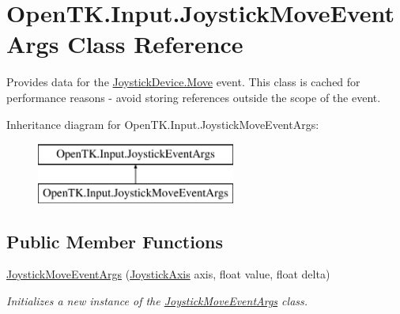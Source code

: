 \hypertarget{class_open_t_k_1_1_input_1_1_joystick_move_event_args}{\section{Open\-T\-K.\-Input.\-Joystick\-Move\-Event\-Args Class Reference}
\label{class_open_t_k_1_1_input_1_1_joystick_move_event_args}
}


Provides data for the \hyperlink{class_open_t_k_1_1_input_1_1_joystick_device_ad9dcc4f6506c543d16e326c7ee08da39}{Joystick\-Device.\-Move} event. This class is cached for performance reasons -\/ avoid storing references outside the scope of the event.  


Inheritance diagram for Open\-T\-K.\-Input.\-Joystick\-Move\-Event\-Args\-:\begin{figure}[H]
\begin{center}
\leavevmode
\includegraphics[height=2.000000cm]{class_open_t_k_1_1_input_1_1_joystick_move_event_args}
\end{center}
\end{figure}
\subsection*{Public Member Functions}
\begin{DoxyCompactItemize}
\item 
\hyperlink{class_open_t_k_1_1_input_1_1_joystick_move_event_args_a0baacfbe5fdd5f1b86cbe60fa084213e}{Joystick\-Move\-Event\-Args} (\hyperlink{namespace_open_t_k_1_1_input_ab565c2e944f2be911b6b39e1d5ee4fda}{Joystick\-Axis} axis, float value, float delta)
\begin{DoxyCompactList}\small\item\em Initializes a new instance of the \hyperlink{class_open_t_k_1_1_input_1_1_joystick_move_event_args}{Joystick\-Move\-Event\-Args} class. \end{DoxyCompactList}\end{DoxyCompactItemize}
